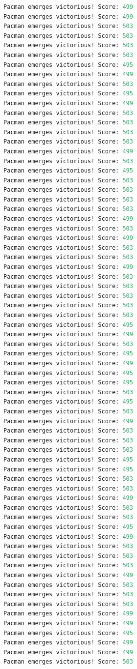 \documentclass{report}
\begin{document}
\begin{lstlisting}[language=Python, caption=Autograder]
Pacman emerges victorious! Score: 499
Pacman emerges victorious! Score: 499
Pacman emerges victorious! Score: 503
Pacman emerges victorious! Score: 503
Pacman emerges victorious! Score: 503
Pacman emerges victorious! Score: 503
Pacman emerges victorious! Score: 495
Pacman emerges victorious! Score: 499
Pacman emerges victorious! Score: 503
Pacman emerges victorious! Score: 495
Pacman emerges victorious! Score: 499
Pacman emerges victorious! Score: 503
Pacman emerges victorious! Score: 503
Pacman emerges victorious! Score: 503
Pacman emerges victorious! Score: 503
Pacman emerges victorious! Score: 499
Pacman emerges victorious! Score: 503
Pacman emerges victorious! Score: 495
Pacman emerges victorious! Score: 503
Pacman emerges victorious! Score: 503
Pacman emerges victorious! Score: 503
Pacman emerges victorious! Score: 503
Pacman emerges victorious! Score: 499
Pacman emerges victorious! Score: 503
Pacman emerges victorious! Score: 499
Pacman emerges victorious! Score: 503
Pacman emerges victorious! Score: 503
Pacman emerges victorious! Score: 499
Pacman emerges victorious! Score: 503
Pacman emerges victorious! Score: 503
Pacman emerges victorious! Score: 503
Pacman emerges victorious! Score: 503
Pacman emerges victorious! Score: 503
Pacman emerges victorious! Score: 495
Pacman emerges victorious! Score: 499
Pacman emerges victorious! Score: 503
Pacman emerges victorious! Score: 495
Pacman emerges victorious! Score: 499
Pacman emerges victorious! Score: 495
Pacman emerges victorious! Score: 495
Pacman emerges victorious! Score: 503
Pacman emerges victorious! Score: 495
Pacman emerges victorious! Score: 503
Pacman emerges victorious! Score: 499
Pacman emerges victorious! Score: 503
Pacman emerges victorious! Score: 503
Pacman emerges victorious! Score: 503
Pacman emerges victorious! Score: 495
Pacman emerges victorious! Score: 495
Pacman emerges victorious! Score: 503
Pacman emerges victorious! Score: 503
Pacman emerges victorious! Score: 499
Pacman emerges victorious! Score: 503
Pacman emerges victorious! Score: 503
Pacman emerges victorious! Score: 495
Pacman emerges victorious! Score: 499
Pacman emerges victorious! Score: 503
Pacman emerges victorious! Score: 503
Pacman emerges victorious! Score: 503
Pacman emerges victorious! Score: 499
Pacman emerges victorious! Score: 503
Pacman emerges victorious! Score: 503
Pacman emerges victorious! Score: 503
Pacman emerges victorious! Score: 499
Pacman emerges victorious! Score: 499
Pacman emerges victorious! Score: 495
Pacman emerges victorious! Score: 499
Pacman emerges victorious! Score: 499
Pacman emerges victorious! Score: 503

\end{lstlisting}
\end{document}

